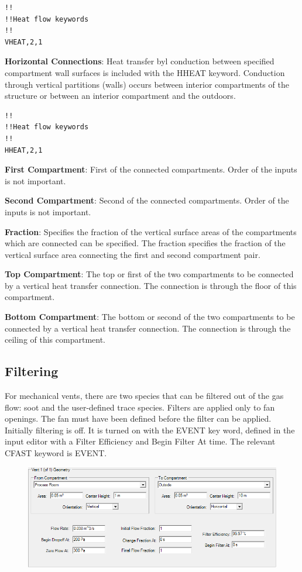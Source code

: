 \begin{lstlisting}
!!
!!Heat flow keywords
!!
VHEAT,2,1
\end{lstlisting}

\textbf{Horizontal Connections}: Heat transfer byl conduction between specified compartment wall surfaces is included with the HHEAT keyword.  Conduction through vertical partitions (walls) occurs between interior compartments of the structure or between an interior compartment and the outdoors.

\begin{lstlisting}
!!
!!Heat flow keywords
!!
HHEAT,2,1
\end{lstlisting}

\textbf{First Compartment}: First of the connected compartments. Order of the inputs is not important.

\textbf{Second Compartment}: Second of the connected compartments. Order of the inputs is not important.

\textbf{Fraction}: Specifies the fraction of the vertical surface areas of the compartments which are connected can be specified. The fraction specifies the fraction of the vertical surface area connecting the first and second compartment pair.

\textbf{Top Compartment}: The top or first of the two compartments to be connected by a vertical heat transfer connection. The connection is through the floor of this compartment.

\textbf{Bottom Compartment}: The bottom or second of the two compartments to be connected by a vertical heat transfer connection. The connection is through the ceiling of this compartment.

\subsection{Filtering}

For mechanical vents, there are two species that can be filtered out of the gas flow: soot and the user-defined trace species. Filters are applied only to fan openings. The fan must have been defined before the filter can be applied. Initially filtering is off. It is turned on with the EVENT key word, defined in the input editor with a Filter Efficiency and Begin Filter At time. The relevant CFAST keyword is EVENT.

\begin{figure}[h!]
\begin{center}
\includegraphics[width=6.5in]{FIGURES/Input_File/Filtering}
\end{center}
\end{figure}

